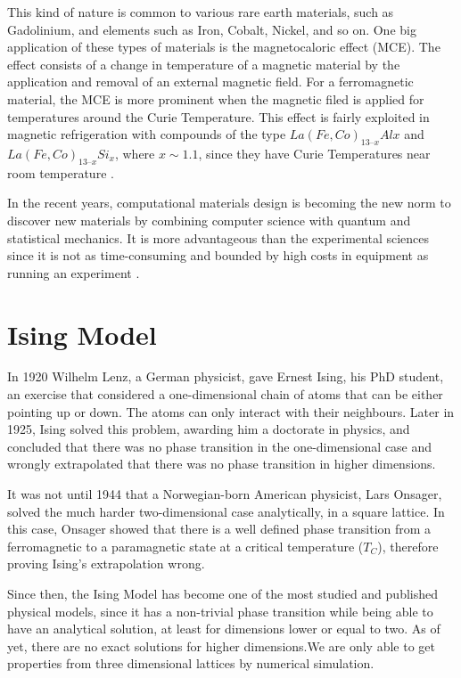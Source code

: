 This kind of nature is common to various rare earth materials, such as Gadolinium,  and elements such as Iron, Cobalt, Nickel, and so on. One big application of these types of materials is the magnetocaloric effect (MCE).
The effect consists of a change in temperature of a magnetic material by the application and removal of an external magnetic field. For a ferromagnetic material, the MCE is more prominent when the magnetic filed is applied for temperatures around the Curie Temperature. 
This effect is fairly exploited in magnetic refrigeration with compounds of the type $La(Fe,Co)_{13– x}Al{x}$ and $La(Fe,Co)_{13–x}Si_x$, where $x\sim 1.1$, since they have Curie Temperatures near room temperature \cite{Gutfleisch2011,Sanvito2017}.

In the recent years, computational materials design is becoming the new norm to discover new materials by combining computer science with quantum and statistical mechanics. It is more advantageous than the experimental sciences since it is not as time-consuming and bounded by high costs in equipment as running an experiment \cite{Curtarolo2013,Chen2019}. 

\section{Ising Model}

In 1920 Wilhelm Lenz, a German physicist, gave Ernest Ising, his PhD student, an exercise that considered a one-dimensional chain of atoms that can be either pointing up or down. The atoms can only interact with their neighbours. Later in 1925, Ising solved this problem, awarding him a doctorate in physics,  and concluded that there was no phase transition in the one-dimensional case and wrongly extrapolated that there was no phase transition in higher dimensions.\cite{Ising1925}

It was not until 1944 that a Norwegian-born American physicist, Lars Onsager, solved the much harder two-dimensional case analytically, in a square lattice\cite{Onsager1944}. In this case, Onsager showed that there is a well defined phase transition from a ferromagnetic to a paramagnetic state at a critical temperature ($T_C$), therefore proving Ising's extrapolation wrong.

Since then, the Ising Model has become one of the most studied and published physical models, since it has a non-trivial phase transition while being able to have an analytical solution, at least for dimensions lower or equal to two. As of yet, there are no exact solutions for higher dimensions.We are only able to get properties from three dimensional lattices by numerical simulation.

